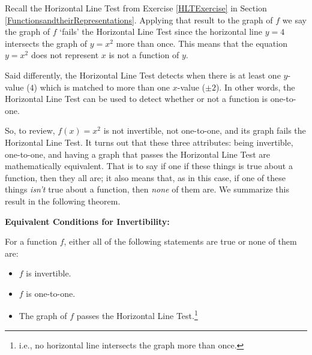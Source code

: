 \documentclass{ximera}
\begin{document}
\smallskip

Recall the Horizontal Line Test from Exercise \ref{HLTExercise} in Section \ref{FunctionsandtheirRepresentations}.  Applying that result to the graph of $f$ we say the graph of $f$ `fails' the Horizontal Line Test  since the horizontal line $y=4$ intersects the graph of $y = x^2$ more than once.  This means that the equation $y=x^2$ does not represent $x$ is not a function of $y$.  

\smallskip

Said differently, the Horizontal Line Test detects when there is at least one $y$-value ($4$) which is matched to more than one $x$-value ($\pm 2$).   In other words, the Horizontal Line Test can be used to detect whether or not a function is one-to-one. 

\smallskip

So, to review, $f(x) = x^2$ is not invertible, not one-to-one, and its graph fails the Horizontal Line Test. It turns out that these three attributes:  being invertible, one-to-one, and having a graph that passes the Horizontal Line Test are mathematically equivalent.   That is to say if one if these things is true about a function, then they all are; it also means that, as in this case,  if one of these things \textit{isn't} true about a function, then \textit{none} of them are.  We summarize this result in the following theorem.

\smallskip


\begin{theorem} \label{inversefunctionequivalency} \textbf{Equivalent Conditions for Invertibility:}  
 
For a function $f$, either all of the following statements are true or none of them are:

\begin{itemize}

\item  $f$ is invertible.

\item $f$ is one-to-one.

\item  The graph of $f$ passes the Horizontal Line Test.\footnote{i.e., no horizontal line intersects the graph more than once.}

\end{itemize}

\end{theorem}
\end{document}
